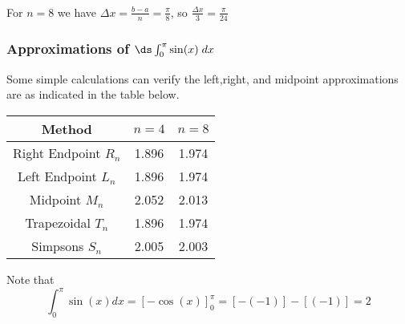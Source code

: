 \begin{frame}
\frametitle{}
For $ n=8 $ we have $ \Delta x=\frac{b-a}{n}=\frac{\pi}{8} $, so $ \frac{\Delta x}{3}=\frac{\pi}{24} $\\


\end{frame}
\begin{frame}
\frametitle{Approximations of $\ds\int_0^\pi\sin(x)\; dx$}
Some simple calculations can verify the  left,right, and midpoint approximations are as indicated in the table below.\\

\begin{center}
\begin{tabular}{|c|c|c|}
\hline Method & $ n=4 $ & $ n=8 $ \\ 
\hline Right Endpoint $ R_n $  & 1.896 & 1.974  \\ 
\hline Left Endpoint $ L_n $ &1.896  & 1.974 \\ 
\hline Midpoint $ M_n $ & 2.052  & 2.013 \\ 
\hline Trapezoidal $ T_n $ &1.896  & 1.974 \\ 
\hline Simpsons $ S_n $ & 2.005 & 2.003 \\ 
\hline 
\end{tabular} 
\end{center}
\pause 
Note that 
\[
\int_0^\pi \sin(x) dx=\left[-\cos(x)\right]_0^\pi =[-(-1)]-[(-1)]=2
\]       


\end{frame}
